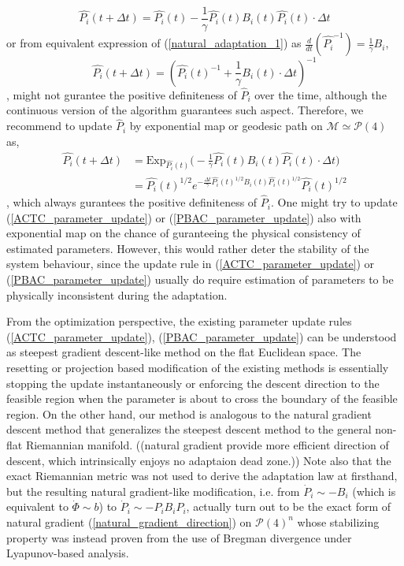 \documentclass[letterpaper, 10 pt, conference]{ieeeconf}  %
\begin{document}
\begin{equation*}
\hat{P_i}(t+\Delta t) = \hat{P_i}(t) - \frac{1}{\gamma}\hat{P_i}(t)B_{i}(t)\hat{P_i}(t)\cdot\Delta t
\end{equation*}
or from equivalent expression of (\ref{natural_adaptation_1}) as $\frac{d}{dt}(\hat{P_i}^{-1}) = \frac{1}{\gamma}B_i$,
\begin{equation*}
\hat{P_i}(t+\Delta t) = (\hat{P_i}(t)^{-1} + \frac{1}{\gamma}B_{i}(t)\cdot\Delta t)^{-1}
\end{equation*}
, might not gurantee the positive definiteness of $\hat{P}_i$ over the time, although the continuous version of the algorithm guarantees such aspect. Therefore, we recommend to update $\hat{P}_i$ by exponential map or geodesic path on $\mathcal{M} \simeq \mathcal{P}(4)$ as,
\begin{align}
\hat{P_i}(t+\Delta t) &= \mathrm{Exp}_{\hat{P_i}(t)}\bigg(-\frac{1}{\gamma}\hat{P_i}(t)B_{i}(t)\hat{P_i}(t)\cdot\Delta t\bigg) \nonumber\\
&=\hat{P_i}(t)^{1/2}e^{-\frac{\Delta t}{\gamma}\hat{P_i}(t)^{1/2}B_i(t)\hat{P_i}(t)^{1/2}}\hat{P_i}(t)^{1/2} \label{natural_adaptation_discrete}
\end{align}
, which always gurantees the positive definiteness of $\hat{P}_i$. One might try to update (\ref{ACTC_parameter_update}) or (\ref{PBAC_parameter_update}) also with exponential map on the chance of guranteeing the physical consistency of estimated parameters. However, this would rather deter the stability of the system behaviour, since the update rule in (\ref{ACTC_parameter_update}) or (\ref{PBAC_parameter_update}) usually do require estimation of parameters to be physically inconsistent during the adaptation.

From the optimization perspective, the existing parameter update rules (\ref{ACTC_parameter_update}), (\ref{PBAC_parameter_update}) can be understood as steepest gradient descent-like method on the flat Euclidean space. The resetting or projection based modification of the existing methods is essentially stopping the update instantaneously or enforcing the descent direction to the feasible region when the parameter is about to cross the boundary of the feasible region. On the other hand, our method is analogous to the natural gradient descent method that generalizes the steepest descent method to the general non-flat Riemannian manifold. ((natural gradient provide more efficient direction of descent, which intrinsically enjoys no adaptaion dead zone.)) Note also that the exact Riemannian metric was not used to derive the adaptation law at firsthand, but the resulting natural gradient-like modification, i.e. from $\dot{P}_i \sim -B_i$ (which is equivalent to $\dot{\Phi} \sim b$) to $ \dot{P}_i\sim -P_iB_iP_i$, actually turn out to be the exact form of natural gradient (\ref{natural_gradient_direction}) on $\mathcal{P}(4)^n$ whose stabilizing property was instead proven from the use of Bregman divergence under Lyapunov-based analysis. 
\end{document}
